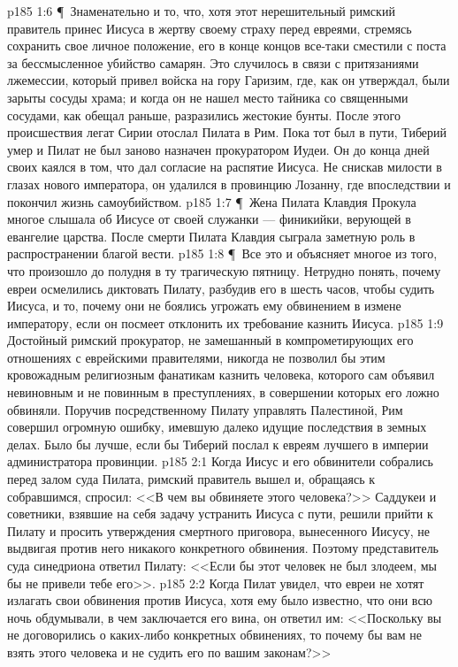 \vs p185 1:6 \P\ Знаменательно и то, что, хотя этот нерешительный римский правитель принес Иисуса в жертву своему страху перед евреями, стремясь сохранить свое личное положение, его в конце концов все\hyp{}таки сместили с поста за бессмысленное убийство самарян. Это случилось в связи с притязаниями лжемессии, который привел войска на гору Гаризим, где, как он утверждал, были зарыты сосуды храма; и когда он не нашел место тайника со священными сосудами, как обещал раньше, разразились жестокие бунты. После этого происшествия легат Сирии отослал Пилата в Рим. Пока тот был в пути, Тиберий умер и Пилат не был заново назначен прокуратором Иудеи. Он до конца дней своих каялся в том, что дал согласие на распятие Иисуса. Не снискав милости в глазах нового императора, он удалился в провинцию Лозанну, где впоследствии и покончил жизнь самоубийством.
\vs p185 1:7 \P\ Жена Пилата Клавдия Прокула многое слышала об Иисусе от своей служанки --- финикийки, верующей в евангелие царства. После смерти Пилата Клавдия сыграла заметную роль в распространении благой вести.
\vs p185 1:8 \P\ Все это и объясняет многое из того, что произошло до полудня в ту трагическую пятницу. Нетрудно понять, почему евреи осмелились диктовать Пилату, разбудив его в шесть часов, чтобы судить Иисуса, и то, почему они не боялись угрожать ему обвинением в измене императору, если он посмеет отклонить их требование казнить Иисуса.
\vs p185 1:9 Достойный римский прокуратор, не замешанный в компрометирующих его отношениях с еврейскими правителями, никогда не позволил бы этим кровожадным религиозным фанатикам казнить человека, которого сам объявил невиновным и не повинным в преступлениях, в совершении которых его ложно обвиняли. Поручив посредственному Пилату управлять Палестиной, Рим совершил огромную ошибку, имевшую далеко идущие последствия в земных делах. Было бы лучше, если бы Тиберий послал к евреям лучшего в империи администратора провинции.
\vs p185 2:1 Когда Иисус и его обвинители собрались перед залом суда Пилата, римский правитель вышел и, обращаясь к собравшимся, спросил: <<В чем вы обвиняете этого человека?>> Саддукеи и советники, взявшие на себя задачу устранить Иисуса с пути, решили прийти к Пилату и просить утверждения смертного приговора, вынесенного Иисусу, не выдвигая против него никакого конкретного обвинения. Поэтому представитель суда синедриона ответил Пилату: <<Если бы этот человек не был злодеем, мы бы не привели тебе его>>.
\vs p185 2:2 Когда Пилат увидел, что евреи не хотят излагать свои обвинения против Иисуса, хотя ему было известно, что они всю ночь обдумывали, в чем заключается его вина, он ответил им: <<Поскольку вы не договорились о каких\hyp{}либо конкретных обвинениях, то почему бы вам не взять этого человека и не судить его по вашим законам?>>
